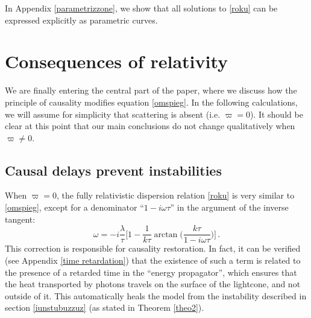 \documentclass[a4paper, amsfonts, amssymb, amsmath, reprint, showkeys, nofootinbib, twoside,notitlepage,onecolumn]{revtex4-2}
\theoremstyle{definition}
\theoremstyle{theorem}
\theoremstyle{corollary}
\begin{document}
In Appendix \ref{parametrizzone}, we show that all solutions to \eqref{roku} can be expressed explicitly as parametric curves.



\section{Consequences of relativity}

We are finally entering the central part of the paper, where we discuss how the principle of causality modifies equation \eqref{omspieg}. In the following calculations, we will assume for simplicity that scattering is absent (i.e. $\varpi=0$). It should be clear at this point that our main conclusions do not change qualitatively when $\varpi \neq 0$.


\subsection{Causal delays prevent instabilities}

When $\varpi=0$, the fully relativistic dispersion relation \eqref{roku} is very similar to \eqref{omspieg}, except for a denominator ``$1{-}i\omega\tau$'' in the argument of the inverse tangent:
\begin{equation}\label{fullrelat}
 \omega=-i \dfrac{\lambda}{\tau} \bigg[ 1-\dfrac{1}{k\tau}\arctan\bigg(\dfrac{k\tau}{1{-}i\omega \tau}\bigg) \bigg] \, .
\end{equation}
This correction is responsible for causality restoration. In fact, it can be verified (see Appendix \ref{time retardation}) that the existence of such a term is related to the presence of a retarded time in the ``energy propagator'', which ensures that the heat transported by photons travels on the surface of the lightcone, and not outside of it. This automatically heals the model from the instability described in section \ref{iunstubuzzuz} (as stated in Theorem \ref{theo2}).
\end{document}
